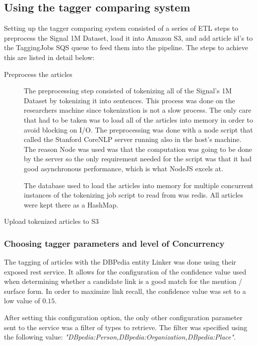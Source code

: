 \subsection{Using the tagger comparing system}\label{TaggingSignal}
Setting up the tagger comparing system consisted of a series of ETL steps to preprocess the Signal 1M Dataset, load it into Amazon S3, and add 
article id's to the TaggingJobs SQS queue to feed them into the pipeline.
The steps to achieve this are listed in detail below:
\begin{description}
\item[Preprocess the articles]
The preprocessing step consisted of tokenizing all of the Signal's 1M Dataset by tokenizing it into sentences.
This process was done on the researchers machine since tokenization is not a slow process.
The only care that had to be taken was to load all of the articles into memory in order to avoid blocking on I/O. 
The preprocessing was done with a node script that called the Stanford CoreNLP server running also in the host's machine.
The reason Node was used was that the computation was going to be done by the server so the only requirement needed for the script was that it had good
asynchronous performance, which is what NodeJS excels at.

The database used to load the articles into memory for multiple concurrent instances of the tokenizing job script to read from was redis\cite{redis}.
All articles were kept there as a HashMap.

\item[Upload tokenized articles to S3]


\end{description}

\subsubsection{Choosing tagger parameters and level of Concurrency}
The tagging of articles with the DBPedia entity Linker was done using their exposed rest service.
It allows for the configuration of the confidence value used when determining whether a candidate link is a good match for the 
mention / surface form. 
In order to maximize link recall, the confidence value was set to a low value of $0.15$.

After setting this configuration option, the only other configuration parameter sent to the service was a filter of types to
retrieve. The filter was specified using the following value: \textit{"DBpedia:Person,DBpedia:Organization,DBpedia:Place"}.

